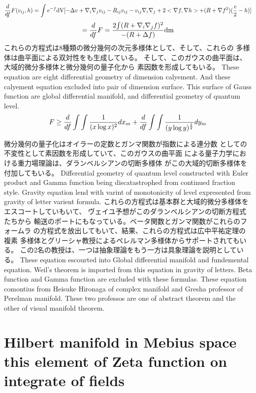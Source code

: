 \documentclass{jsarticle}
\begin{document}
{  $$ {d \over d f}F(v_{ij},h) = \int {e^{-f}\mathrm{dV}}
  [- \Delta v + \nabla_{i}\nabla_{j}
  v_{ij} - R_{ij}v_{ij} - v_{ij}\nabla_{i}\nabla_{j} + 2 <\nabla f,\nabla h>
  + (R + \nabla f^2)({v \over 2} - h)]$$
  $$ = {d \over d f}F = {2 {\int (R + \nabla_{i}\nabla_{j} f)^2} \over 
  { - (R + \Delta f)}}\mathrm{dm} $$
  これらの方程式は8種類の微分幾何の次元多様体として、そして、これらの
  多様体は曲平面による双対性をも生成している。 
  そして、このガウスの曲平面は、大域的微分多様体と微分幾何の量子化から
  素因数を形成してもいる。
  These equation are eight differential geometry of dimension calyement.
  And these calyement equation excluded into pair of dimension surface.
  This surface of Gauss function are global differential manifold,
  and differential geometry of quantum level.
  $$ F \ge {d \over d f}\int \int{1 \over (x \log x)^2}dx_m 
  + {d \over d f}\int \int{1 \over (y \log y)^{1 \over 2}}dy_m $$

  微分幾何の量子化はオイラーの定数とガンマ関数が指数による連分数
  としての不変性として素因数を形成していて、このガウスの曲平面
  による量子力学における重力場理論は、ダランベルシアンの切断多様体
  がこの大域的切断多様体を付加してもいる。
  Differential geometry of quantum level constructed with Euler product
  and Gamma function being discatastrophed from continued fraction style.
  Gravity equation lend with varint of monotonicity of level expresented
  from gravity of letter varient formula.
  これらの方程式は基本群と大域的微分多様体をエスコートしていもいて、
  ヴェイユ予想がこのダランベルシアンの切断方程式たちから
  輸送のポートにもなっている。ベータ関数とガンマ関数がこれらのフォームラ
  の方程式を放出してもいて、結果、これらの方程式は広中平祐定理の複素
  多様体とグリーシャ教授によるペレルマン多様体からサポートされてもいる。
  この2名の教授は、一つは抽象理論をもう一方は具象理論を説明としている。
  These equation escourted into Global differential manifold and
  fundemental equation.
  Weil's theorem is imported from this equation in gravity of letters.
  Beta function and Gamma function are excluded with these formulas.
  These equation comontius from Heisuke Hironaga of complex manifold
  and Gresha professor of Perelman manifold.
  These two professos are one of abstract theorem and the other of
  visual manifold theorem.

\section{Hilbert manifold in Mebius space \\
        this element of Zeta function on integrate of fields}

}
\end{document}
